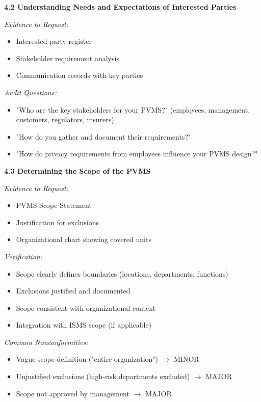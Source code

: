 \documentclass[11pt,a4paper]{article}
\begin{document}
\textbf{4.2 Understanding Needs and Expectations of Interested Parties}

\textit{Evidence to Request:}
\begin{itemize}
\item Interested party register
\item Stakeholder requirement analysis
\item Communication records with key parties
\end{itemize}

\textit{Audit Questions:}
\begin{itemize}
\item "Who are the key stakeholders for your PVMS?" (employees, management, customers, regulators, insurers)
\item "How do you gather and document their requirements?"
\item "How do privacy requirements from employees influence your PVMS design?"
\end{itemize}

\textbf{4.3 Determining the Scope of the PVMS}

\textit{Evidence to Request:}
\begin{itemize}
\item PVMS Scope Statement
\item Justification for exclusions
\item Organizational chart showing covered units
\end{itemize}

\textit{Verification:}
\begin{itemize}
\item Scope clearly defines boundaries (locations, departments, functions)
\item Exclusions justified and documented
\item Scope consistent with organizational context
\item Integration with ISMS scope (if applicable)
\end{itemize}

\textit{Common Nonconformities:}
\begin{itemize}
\item Vague scope definition ("entire organization") $\rightarrow$ MINOR
\item Unjustified exclusions (high-risk departments excluded) $\rightarrow$ MAJOR
\item Scope not approved by management $\rightarrow$ MAJOR
\end{itemize}
\end{document}
